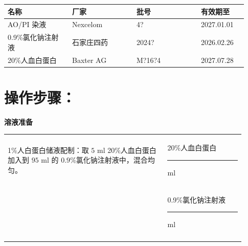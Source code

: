\documentclass[UTF8,10pt,a4paper,fontset=fandol]{ctexart}
\newcommand{\fieldvalue}[1]{#1}
\newcommand{\handwritten}[1]{#1}
\begin{document}
\begin{tabular}{|p{0.25\linewidth}|p{0.25\linewidth}|p{0.25\linewidth}|p{0.18\linewidth}|}
\hline
名称 & 厂家 & 批号 & 有效期至\\
\hline
\fieldvalue{AO/PI 染液}
&
\fieldvalue{Nexcelom}
&
\fieldvalue{\handwritten{4?}}
&
\fieldvalue{\handwritten{2027.01.01}}\\
\hline
\fieldvalue{0.9\%氯化钠注射液}
&
\fieldvalue{石家庄四药}
&
\fieldvalue{\handwritten{2024?}}
&
\fieldvalue{\handwritten{2026.02.26}}\\
\hline
\fieldvalue{20\%人血白蛋白}
&
\fieldvalue{Baxter AG}
&
\fieldvalue{\handwritten{M?16?4}}
&
\fieldvalue{\handwritten{2027.07.28}}\\
\hline
\end{tabular}

\section{操作步骤：}

\begin{center}
\textbf{溶液准备}
\end{center}

\begin{tabular}{|p{0.62\linewidth}|p{0.30\linewidth}|}
\hline
1\%人白蛋白储液配制：取 $5$ ml 20\%人血白蛋白加入到 $95$ ml 的 $0.9\%$氯化钠注射液中，混合均匀。&
20\%人血白蛋白 \rule{1.5cm}{0.4pt} ml\\
&
0.9\%氯化钠注射液 \rule{1.5cm}{0.4pt} ml\\
\hline
&
\end{tabular}
\end{document}
